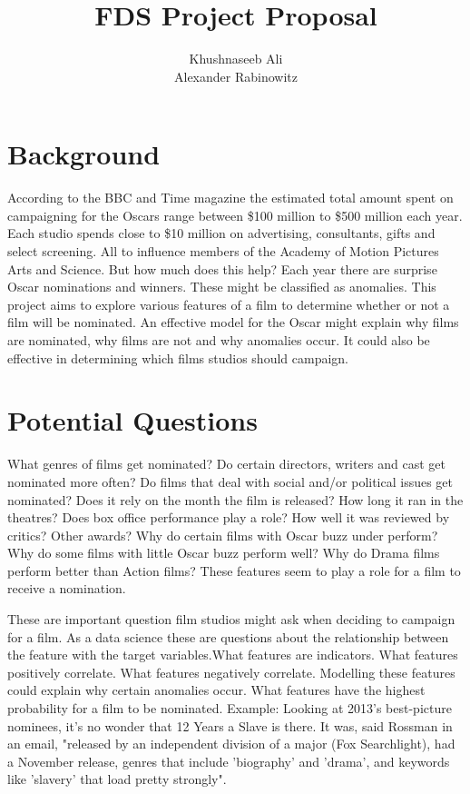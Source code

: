 \documentclass[]{report}
\title{FDS Project Proposal}
\author{Khushnaseeb Ali\\	Alexander Rabinowitz}
\begin{document}
\maketitle

\section*{Background }

According to the BBC and Time magazine the estimated total amount spent on campaigning for
the Oscars range between \$100 million to \$500 million each year. Each studio spends close to
\$10 million on advertising, consultants, gifts and select screening. All to influence members of
the Academy of Motion Pictures Arts and Science. But how much does this help?
Each year there are surprise Oscar nominations and winners. These might be classified as
anomalies. This project aims to explore various features of a film to determine whether or not a
film will be nominated. An effective model for the Oscar might explain why films are nominated,
why films are not and why anomalies occur. It could also be effective in determining which films
studios should campaign. 
\section*{Potential Questions}

What genres of films get nominated? Do certain directors, writers and cast get nominated more
often? Do films that deal with social and/or political issues get nominated? Does it rely on the
month the film is released? How long it ran in the theatres? Does box office performance play a
role? How well it was reviewed by critics? Other awards? Why do certain films with Oscar buzz
under perform? Why do some films with little Oscar buzz perform well? Why do Drama films
perform better than Action films? These features seem to play a role for a film to receive a
nomination.

These are important question film studios might ask when deciding to campaign for a film. As a
data science these are questions about the relationship between the feature with the target
variables.What features are indicators. What features positively correlate. What features
negatively correlate. Modelling these features could explain why certain anomalies occur. What
features have the highest probability for a film to be nominated. Example: Looking at 2013’s best-picture nominees, 
it's no wonder that 12 Years a Slave is there. It was, said Rossman in an email, "released by an independent division of a major (Fox
Searchlight), had a November release, genres that include 'biography' and 'drama', and
keywords like 'slavery' that load pretty strongly".
\end{document}
